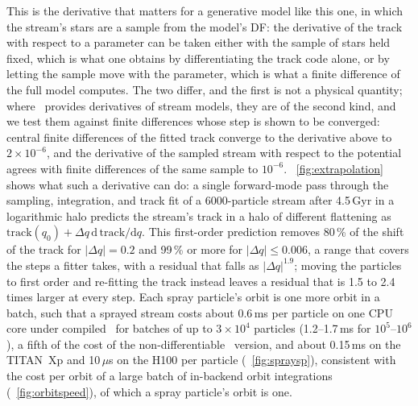 This is the derivative that matters for a generative model like this
one, in which the stream's stars are a sample from the model's DF: the
derivative of the track with respect to a parameter can be taken
either with the sample of stars held fixed, which is what one obtains
by differentiating the track code alone, or by letting the sample move
with the parameter, which is what a finite difference of the full
model computes. The two differ, and the first is not a physical
quantity; where \galpy\ provides derivatives of stream models, they
are of the second kind, and we test them against finite differences
whose step is shown to be converged: central finite differences of the
fitted track converge to the derivative above to $2\times10^{-6}$, and
the derivative of the sampled stream with respect to the potential
agrees with finite differences of the same sample to $10^{-6}$.
\figurename~\ref{fig:extrapolation} shows what such a derivative can
do: a single forward-mode pass through the sampling, integration, and
track fit of a 6000-particle stream after 4.5\,Gyr in a logarithmic
halo predicts the stream's track in a halo of different flattening as
$\mathrm{track}(q_0)+\Delta q\,\mathrm{d\,track}/\mathrm{d}q$. This
first-order prediction removes 80\,\% of the shift of the track for
$|\Delta q|=0.2$ and 99\,\% or more for $|\Delta q|\leq0.006$, a range
that covers the steps a fitter takes, with a residual that falls as
$|\Delta q|^{1.9}$; moving the particles to first order and re-fitting
the track instead leaves a residual that is 1.5 to 2.4 times larger at
every step. Each spray
particle's orbit is one more orbit in a batch, such that a sprayed
stream costs about 0.6\,ms per particle on one CPU core under compiled
\jax\ for batches of up to $3\times10^4$ particles (1.2--1.7\,ms for
$10^5$--$10^6$), a fifth of the cost
of the non-differentiable \cc\ version, and
about 0.15\,ms on the TITAN~Xp and 10\,$\mu$s on the H100 per particle
(\figurename~\ref{fig:spraysp}), consistent with the cost per orbit of
a large batch of in-backend orbit integrations
(\figurename~\ref{fig:orbitspeed}), of which a spray particle's orbit
is one.

